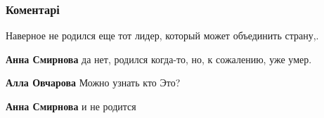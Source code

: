  
 
 
 
 
\subsubsection{Коментарі}

\begin{itemize}
 
Наверное не родился еще тот лидер, который может объединить страну,.

\begin{itemize}
 
\textbf{Анна Смирнова} да нет, родился когда-то, но, к сожалению, уже умер.

 
\textbf{Алла Овчарова} Можно узнать кто Это?

 
\textbf{Анна Смирнова} и не родится
\end{itemize}

 

\end{itemize}
